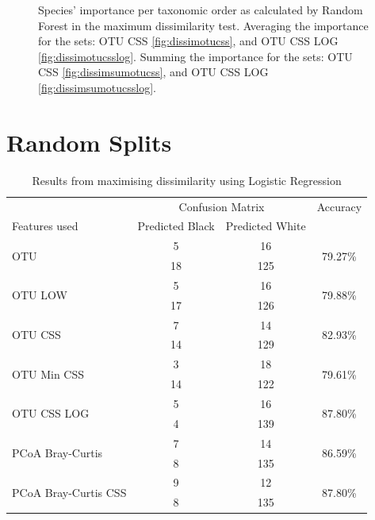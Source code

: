 \begin{figure}[h]
	\caption{Species' importance per taxonomic order as calculated by Random Forest in the maximum dissimilarity test. Averaging the importance for the sets: OTU CSS \ref{fig:dissimotucss}, and OTU CSS LOG \ref{fig:dissimotucsslog}. Summing the importance for the sets: OTU CSS \ref{fig:dissimsumotucss}, and OTU CSS LOG \ref{fig:dissimsumotucsslog}.
	 }
	\label{fig:dispie}
\end{figure}

\section{Random Splits}
\begin{table}[h]
	\centering
	\caption{Results from maximising dissimilarity using Logistic Regression}
	\label{table:lrdissimilarity}
	\begin{tabular}{l c  c c}
		\toprule
		&\multicolumn{2}{c}{Confusion Matrix} & Accuracy\\
		Features used & Predicted Black&Predicted White&\\
		\midrule
		\multirow{2}{*}{OTU} &5 &16&\multirow{2}{*}{79.27\%}\\
		&	 18&125&\\
		\cmidrule{2-3}
		\multirow{2}{*}{OTU LOW} &5 &16&\multirow{2}{*}{79.88\%}\\
		&	 17&126&\\
		\cmidrule{2-3}
		\multirow{2}{*}{OTU CSS}&7 &14&\multirow{2}{*}{82.93\%}\\
		&	 14&129&\\
		\cmidrule{2-3}
		\multirow{2}{*}{OTU Min CSS}&3 &18&\multirow{2}{*}{79.61\%}\\
		&	 14&122&\\
		\cmidrule{2-3}
		\multirow{2}{*}{OTU CSS LOG}&5 &16&\multirow{2}{*}{87.80\%}\\
		&	 4&139&\\
		\cmidrule{2-3}
		\multirow{2}{*}{PCoA Bray-Curtis} &7 &14&\multirow{2}{*}{86.59\%}\\
		&	 8&135&\\
		\cmidrule{2-3}
		\multirow{2}{*}{PCoA Bray-Curtis CSS} &9 &12&\multirow{2}{*}{87.80\%}\\
		&	 8&135&\\
		\bottomrule
	\end{tabular}
	
\end{table}

